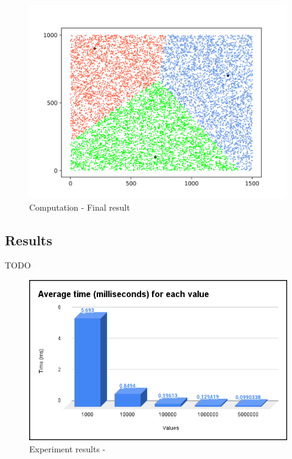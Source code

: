 \begin{figure}[!ht]
    \centering
    \includegraphics[width=\linewidth]{document/chapters/chapter_7/images/computation_final_result.png}
    \caption{Computation - Final result}
    \label{fig:computation_final_result}
\end{figure}

\subsection{Results}
TODO

\begin{figure}[!ht]
    \centering
    \includegraphics[scale=0.55]{document/chapters/chapter_7/images/experiment_results_avg_ms_per_value.png}
    \caption{Experiment results -}
    \label{fig:experiment_results_avg_ms_per_value}
\end{figure}
